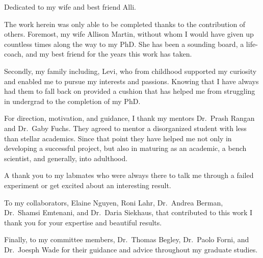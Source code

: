 \documentclass[12pt,oneside]{reedthesis}
\begin{document}
  \begin{dedication}
  \pagestyle{plain}
    Dedicated to my wife and best friend Alli.
  \end{dedication}
  \begin{acknowledgements}
  \pagestyle{plain}

    \par

    The work herein was only able to be completed thanks to the contribution of others. Foremost, my wife Allison Martin, without whom I would have given up countless times along the way to my PhD. She has been a sounding board, a life-coach, and my best friend for the years this work has taken.

    \par

    Secondly, my family including, Levi, who from childhood supported my curiosity and enabled me to pursue my interests and passions. Knowing that I have always had them to fall back on provided a cushion that has helped me from struggling in undergrad to the completion of my PhD.

    \par

    For direction, motivation, and guidance, I thank my mentors Dr.~Prash Rangan and Dr.~Gaby Fuchs. They agreed to mentor a disorganized student with less than stellar academics. Since that point they have helped me not only in developing a successful project, but also in maturing as an academic, a bench scientist, and generally, into adulthood.

    \par

    A thank you to my labmates who were always there to talk me through a failed experiment or get excited about an interesting result.

    \par

    To my collaborators, Elaine Nguyen, Roni Lahr, Dr.~Andrea Berman, Dr.~Shamsi Emtenani, and Dr.~Daria Siekhaus, that contributed to this work I thank you for your expertise and beautiful results.

    \par

    Finally, to my committee members, Dr.~Thomas Begley, Dr.~Paolo Forni, and Dr.~Joesph Wade for their guidance and advice throughout my graduate studies.
  \end{acknowledgements}
\end{document}
